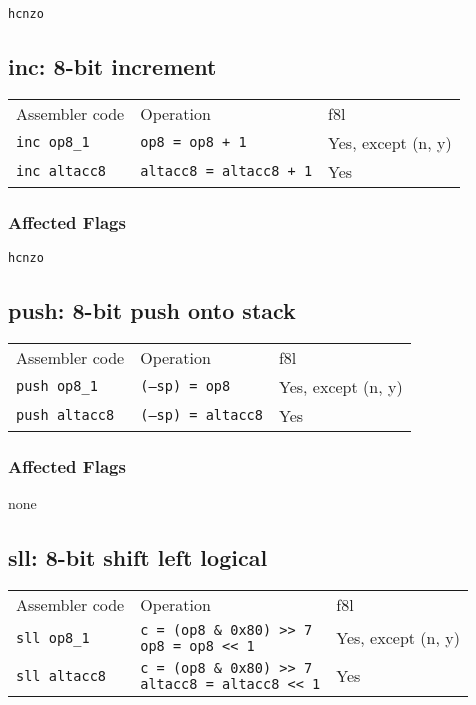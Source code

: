 \documentclass{book}
\begin{document}
\texttt{hcnzo}


\subsection{inc: 8-bit increment}

\begin{tabular}{l l l}
Assembler code       & Operation                      & f8l \\
\texttt{inc op8\_1}  & \texttt{op8 = op8 + 1}         & Yes, except (n, y) \\
\texttt{inc altacc8} & \texttt{altacc8 = altacc8 + 1} & Yes
\end{tabular}

\subsubsection*{Affected Flags}

\texttt{hcnzo}


\subsection{push: 8-bit push onto stack}

\begin{tabular}{l l l}
Assembler code        & Operation                 & f8l \\
\texttt{push op8\_1}  & \texttt{(--sp) = op8}     & Yes, except (n, y) \\
\texttt{push altacc8} & \texttt{(--sp) = altacc8} & Yes
\end{tabular}

\subsubsection*{Affected Flags}

none


\subsection{sll: 8-bit shift left logical}

\begin{tabular}{l l l}
Assembler code       & Operation                                                                   & f8l \\
\texttt{sll op8\_1}  & \makecell{\texttt{c = (op8 \& 0x80) >> 7}\\\texttt{op8 = op8 << 1}}         & Yes, except (n, y) \\
\texttt{sll altacc8} & \makecell{\texttt{c = (op8 \& 0x80) >> 7}\\\texttt{altacc8 = altacc8 << 1}} & Yes
\end{tabular}
\end{document}
